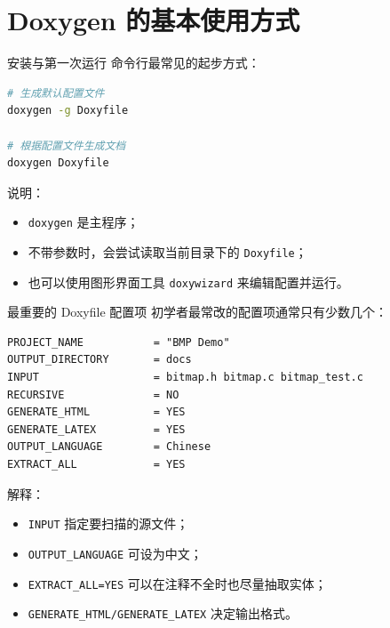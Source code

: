 \documentclass[aspectratio=169,11pt]{beamer}
\begin{document}
\section{Doxygen 的基本使用方式}

\begin{frame}[fragile]{安装与第一次运行}
命令行最常见的起步方式：

\begin{lstlisting}[language=bash]
# 生成默认配置文件
doxygen -g Doxyfile

# 根据配置文件生成文档
doxygen Doxyfile
\end{lstlisting}

\vspace{0.5em}
说明：
\begin{itemize}
  \item \texttt{doxygen} 是主程序；
  \item 不带参数时，会尝试读取当前目录下的 \texttt{Doxyfile}；
  \item 也可以使用图形界面工具 \texttt{doxywizard} 来编辑配置并运行。
\end{itemize}
\end{frame}

\begin{frame}[fragile]{最重要的 Doxyfile 配置项}
初学者最常改的配置项通常只有少数几个：

\begin{lstlisting}
PROJECT_NAME           = "BMP Demo"
OUTPUT_DIRECTORY       = docs
INPUT                  = bitmap.h bitmap.c bitmap_test.c
RECURSIVE              = NO
GENERATE_HTML          = YES
GENERATE_LATEX         = YES
OUTPUT_LANGUAGE        = Chinese
EXTRACT_ALL            = YES
\end{lstlisting}

\vspace{0.5em}
解释：
\begin{itemize}
  \item \texttt{INPUT} 指定要扫描的源文件；
  \item \texttt{OUTPUT\_LANGUAGE} 可设为中文；
  \item \texttt{EXTRACT\_ALL=YES} 可以在注释不全时也尽量抽取实体；
  \item \texttt{GENERATE\_HTML/GENERATE\_LATEX} 决定输出格式。
\end{itemize}
\end{frame}
\end{document}
